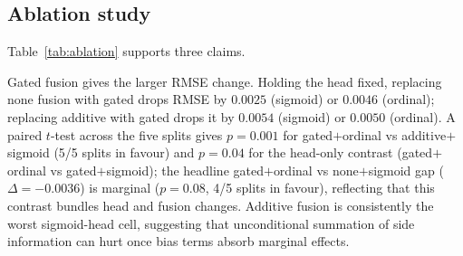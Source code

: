 \documentclass[a4paper]{article} %
\begin{document}
\begin{table}[ht]
\centering
\caption{Ablation matrix on MovieLens-100K, mean $\pm$ std across the five
canonical splits \texttt{u1}--\texttt{u5} (each split-mean averages three
seeds). Bold = best per column. Lower is better for RMSE/MAE/NLL, higher for
Accuracy.}
\label{tab:ablation}
\end{table}

\subsection{Ablation study}
\label{sec:ablation}
Table~\ref{tab:ablation} supports three claims.

Gated fusion gives the larger RMSE change. Holding the head fixed, replacing
none fusion with gated drops RMSE by $0.0025$ (sigmoid) or $0.0046$ (ordinal);
replacing additive with gated drops it by $0.0054$ (sigmoid) or $0.0050$
(ordinal). A paired $t$-test across the five splits gives $p=0.001$ for
gated$+$ordinal vs additive$+$sigmoid (5/5 splits in favour) and $p=0.04$ for
the head-only contrast (gated$+$ordinal vs gated$+$sigmoid); the headline
gated$+$ordinal vs none$+$sigmoid gap ($\Delta=-0.0036$) is marginal
($p=0.08$, 4/5 splits in favour), reflecting that this contrast bundles head
and fusion changes. Additive fusion is consistently the worst sigmoid-head
cell, suggesting that unconditional summation of side information can hurt
once bias terms absorb marginal effects.
\end{document}
